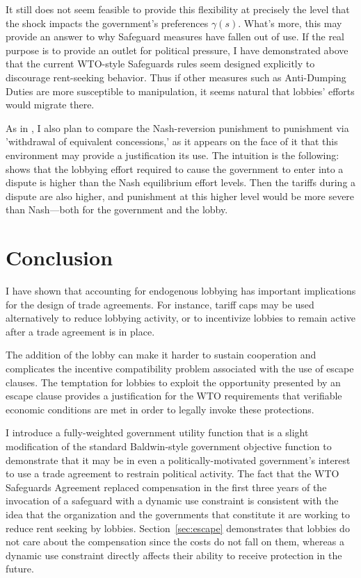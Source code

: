 \documentclass[12pt]{article}
\newcommand{\ga}{\gamma}
\begin{document}
It still does not seem feasible to provide this flexibility at precisely the level that the shock impacts the government's preferences $\ga(s)$. What's more, this may provide an answer to why Safeguard measures have fallen out of use. If the real purpose is to provide an outlet for political pressure, I have demonstrated above that the current WTO-style Safeguards rules seem designed explicitly to discourage rent-seeking behavior. Thus if other measures such as Anti-Dumping Duties are more susceptible to manipulation, it seems natural that lobbies' efforts would migrate there.

As in \Textcite{zissimos}, I also plan to compare the Nash-reversion punishment to punishment via 'withdrawal of equivalent concessions,' as it appears on the face of it that this environment may provide a justification its use. The intuition is the following: \Textcite{buzard2013a} shows that the lobbying effort required to cause the government to enter into a dispute is higher than the Nash equilibrium effort levels. Then the tariffs during a dispute are also higher, and punishment at this higher level would be more severe than Nash---both for the government and the lobby.

		


%

\section{Conclusion}
\label{sec:concl}
I have shown that accounting for endogenous lobbying has important implications for the design of trade agreements. For instance, tariff caps may be used alternatively to reduce lobbying activity, or to incentivize lobbies to remain active after a trade agreement is in place.

The addition of the lobby can make it harder to sustain cooperation and complicates the incentive compatibility problem associated with the use of escape clauses. The temptation for lobbies to exploit the opportunity presented by an escape clause provides a justification for the WTO requirements that verifiable economic conditions are met in order to legally invoke these protections.

I introduce a fully-weighted government utility function that is a slight modification of the standard Baldwin-style government objective function to demonstrate that it may be in even a politically-motivated government's interest to use a trade agreement to restrain political activity. The fact that the WTO Safeguards Agreement replaced compensation in the first three years of the invocation of a safeguard with a dynamic use constraint is consistent with the idea that the organization and the governments that constitute it are working to reduce rent seeking by lobbies. Section~\ref{sec:escape} demonstrates that lobbies do not care about the compensation since the costs do not fall on them, whereas a dynamic use constraint directly affects their ability to receive protection in the future.
\end{document}
